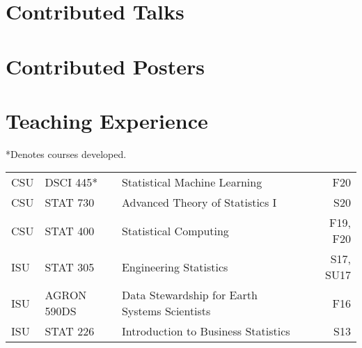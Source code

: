 \documentclass[margin,line]{res}
\begin{document}
\begin{resume}
\section{\sc Contributed Talks}
\printbibliography[keyword=talk-contributed, heading=none, resetnumbers=true]

\section{\sc Contributed Posters}
\printbibliography[keyword=poster, heading=none, resetnumbers=true]

\section{\sc Teaching Experience}
*Denotes courses developed.\\

\begin{table}[H]
\begin{tabular}{l l l r}
CSU & DSCI 445* & Statistical Machine Learning & F20 \\
CSU & STAT 730 & Advanced Theory of Statistics I & S20 \\
CSU & STAT 400 & Statistical Computing & F19, F20 \\
ISU & STAT 305 & Engineering Statistics & S17, SU17 \\
ISU & AGRON 590DS & Data Stewardship for Earth Systems Scientists & F16 \\
ISU & STAT 226 & Introduction to Business Statistics & S13 \\
\end{tabular}
\end{table}

% 
% 
% 
% 


\end{resume}
\end{document}
